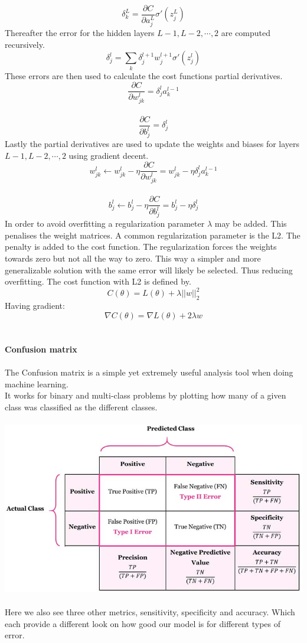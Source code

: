 \documentclass[12pt, letterpaper, twoside]{article}
\begin{document}
$$
\delta_k^L = \frac{\partial C}{\partial a_j^L}\sigma'(z_j^L)
$$
Thereafter the error for the hidden layers $L-1, L-2,\cdots,2$ are computed recursively.\\
$$
\delta_j^l = \sum_k \delta_j^{l+1} w_j^{l+1} \sigma'(z_j^{l})
$$
These errors are then used to calculate the cost functions partial derivatives.\\
$$
\frac{\partial C}{\partial w_{jk}^{l}} = \delta_j^l a_k^{l-1}
$$
\ \\
$$
\frac{\partial C}{\partial b_j^l} = \delta_j^l
$$
Lastly the partial derivatives are used to update the weights and biases for layers $L-1,L-2,\cdots,2$ using gradient decent.\\
$$
w_{jk}^l \leftarrow w_{jk}^l - \eta \frac{\partial C}{\partial w_{jk}^l}
= w_{jk}^l - \eta \delta_j^l a_{k}^{l-1}
$$
\ \\
$$
b_j^l \leftarrow b_j^l - \eta \frac{\partial C}{\partial b_j^l}
= b_j^l - \eta \delta_j^l
$$
In order to avoid overfitting a regularization parameter $\lambda$ may be added. This penalises the weight matrices. A common regularization parameter is the L2. The penalty is added to the cost function. The regularization forces the weights towards zero but not all the way to zero. This way a simpler and more generalizable solution with the same error will likely be selected. Thus reducing overfitting. The cost function with L2 is defined by.
$$
C(\theta) = L(\theta) + \lambda||w||_2^2
$$
Having gradient:
$$
\nabla C(\theta) = \nabla L(\theta) + 2 \lambda w
$$
\ \\
\ \\
\textbf{Confusion matrix}\\
\ \\
The Confusion matrix is a simple yet extremely useful analysis tool when doing machine learning.\\
It works for binary and multi-class problems by plotting how many of a given class was classified as the different classes.\\
\ \\
\includegraphics[scale=0.75]{"CM.jpg"}\\
\ \\
Here we also see three other metrics, sensitivity, specificity and accuracy. Which each provide a different look on how good our model is for different types of error.\\
\end{document}
